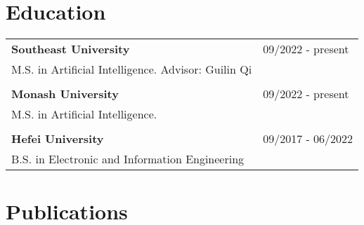 \documentclass[a4paper,12pt]{article}
\begin{document}
\section{Education}
\begin{tabularx}{\linewidth}{@{}l X@{}}	

\textbf{Southeast University } & \hfill 09/2022 - present \\
M.S. in Artificial Intelligence. Advisor: Guilin Qi \\
\\
\textbf{Monash University } & \hfill 09/2022 - present \\
M.S. in Artificial Intelligence. \\
\\
\textbf{Hefei University} & \hfill 09/2017 - 06/2022 \\
B.S. in Electronic and Information Engineering\\




\end{tabularx}

\section{Publications}
\end{document}
